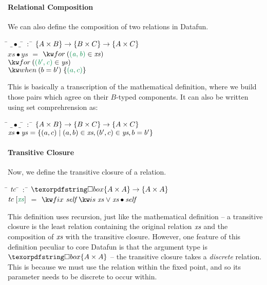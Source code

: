 \paragraph{Relational Composition}
We can also define the composition of two relations in Datafun. 
\begin{tabbing}
  \qquad\=\+ \kill
  $\_ \bullet \_$ \;\;\;\= $\,:$\;\; \=
  $ \{{A \times B}\} \to \{{B \times C}\} \to \{{A \times C}\}$ \\

  $\mathit{xs} \bullet \mathit{ys}$ \> $=$ \> $\efor{(a,b)}{\mathit{xs}}{}$ \\
                                    \>     \> $\efor{(b',c)}{\mathit{ys}}{}$ \\
                                    \>     \> $\ewhen{b = b'}{\eset{(a,c)}}$
\end{tabbing}
This is basically a transcription of the mathematical definition, where we build
those pairs which agree on their $B$-typed components. It can also be written using
set comprehrension as:
\begin{tabbing}
  \qquad\=\+ \kill
  $\_ \bullet \_$ \;\;\;\= $\,:$\;\; \=
  $ \{{A \times B}\} \to \{{B \times C}\} \to \{{A \times C}\}$ \\

  $\mathit{xs} \bullet \mathit{ys} = \{(a,c) \mathrel{|} (a,b) \in \text{\itshape xs}, (b', c) \in \text{\itshape ys}, b = b'\}$
\end{tabbing}


\paragraph{Transitive Closure}\label{sec:generic-transitive-closure}
Now, we define the transitive closure of a relation. 
\begin{tabbing}
  \qquad\=\+ \kill
  $\text{\itshape tc}$ \qquad \= $\,:$ \;\;\= $\iso{\tset{A \times A}} \to \tset{A \times A}$ \\
  $\name{tc}\;\ebox{\mathit{xs}}$ \> $=$ \> $\efixis{\name{self}}{\name{xs} \vee \name{xs} \bullet\name{self}}$ 
\end{tabbing}

This definition uses recursion, just like the mathematical definition --
a transitive closure is the least relation containing the original relation $\text{\itshape xs}$
and the composition of $\text{\itshape xs}$ with the transitive closure. However, one
feature of this definition peculiar to core Datafun is that the argument type
is $\iso \tset{A \times A}$ -- the transitive closure takes a \emph{discrete} relation.
This is because we must use the relation within the fixed point, and so its parameter needs
to be discrete to occur within. 



